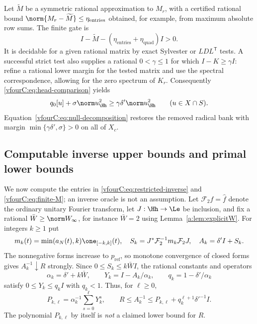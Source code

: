 Let $\widetilde M$ be a symmetric rational approximation to $M_r$, with a
certified rational bound
$\norm{M_r-\widetilde M}\le\eta_{\mathrm{entries}}$ obtained, for example,
from maximum absolute row sums.  The finite gate is
\begin{equation}\label{vfourC:eq:gate}
 I-\widetilde M
       -(\eta_{\mathrm{entries}}+\eta_{\mathrm{quad}})I>0.
\end{equation}
It is decidable for a given rational matrix by exact Sylvester or
$LDL^{\mathsf T}$ tests.  A successful strict test also supplies a rational
$0<\gamma\le1$ for which $I-K\ge\gamma I$: refine a rational lower margin for
the tested matrix and use the spectral correspondence, allowing for the zero
spectrum of $K_r$.  Consequently \eqref{vfourC:eq:head-comparison} yields
\[
 q_0[u]+\sigma\norm u_{\Hh}^2
        \ge\gamma\delta'\norm u_{\Hh}^2\qquad(u\in X\cap S).
\]
Equation~\eqref{vfourC:eq:null-decomposition} restores the removed radical bank
with margin $\min\{\gamma\delta',\sigma\}>0$ on all of $X_c$.

\subsection{Computable inverse upper bounds and primal lower bounds}
\label{vfourC:subsec:inverse}

We now compute the entries in \eqref{vfourC:eq:restricted-inverse} and
\eqref{vfourC:eq:finite-M}; an inverse oracle is not an assumption.  Let
$\mathcal F_2f=\widehat f$ denote the ordinary unitary Fourier transform, let
$J:\Hh\to\Le$ be inclusion, and fix a rational
$\bar W\ge\norm W_\infty$, for instance $\bar W=2$ using
Lemma~\ref{a:lem:explicitW}.  For integers $k\ge1$ put
\[
 m_k(t)=\min(a_N(t),k)\one_{[-k,k]}(t),\quad
 S_k=J^*\mathcal F_2^{-1}m_k\mathcal F_2J,\quad A_k=\delta'I+S_k.
\]
The nonnegative forms increase to $p_{\mathrm{ref}}$, so monotone convergence
of closed forms gives $A_k^{-1}\downarrow R$ strongly.  Since
$0\le S_k\le k\bar W I$, the rational constants and operators
\[
 \alpha_k=\delta'+k\bar W,\qquad
 Y_k=I-A_k/\alpha_k,\qquad q_k=1-\delta'/\alpha_k
\]
satisfy $0\le Y_k\le q_k I$ with $q_k<1$.  Thus, for $\ell\ge0$,
\begin{equation}\label{vfourC:eq:inverse-upper}
 P_{k,\ell}=\alpha_k^{-1}\sum_{s=0}^{\ell}Y_k^s,
 \qquad
 R\le A_k^{-1}\le P_{k,\ell}
                  +q_k^{\ell+1}\delta'^{-1}I.
\end{equation}
The polynomial $P_{k,\ell}$ by itself is \emph{not} a claimed lower bound for
$R$.

